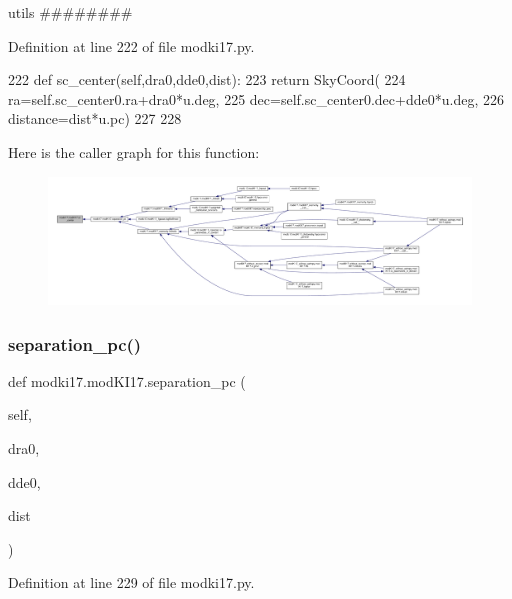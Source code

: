 utils \#\#\#\#\#\#\#\# 



Definition at line 222 of file modki17.\+py.


\begin{DoxyCode}
222     \textcolor{keyword}{def }sc\_center(self,dra0,dde0,dist):
223         \textcolor{keywordflow}{return} SkyCoord(
224             ra=self.sc\_center0.ra+dra0*u.deg,
225             dec=self.sc\_center0.dec+dde0*u.deg,
226             distance=dist*u.pc)
227 
228     
\end{DoxyCode}
Here is the caller graph for this function\+:\nopagebreak
\begin{figure}[H]
\begin{center}
\leavevmode
\includegraphics[width=350pt]{df/da3/classmodki17_1_1modKI17_ad898986b5d2781fbf18c5778d393805a_icgraph}
\end{center}
\end{figure}
\mbox{\label{classmodki17_1_1modKI17_aa68e948ebfbe3aeef6d9defb249317c4}} 
\subsubsection{\texorpdfstring{separation\+\_\+pc()}{separation\_pc()}}
{\footnotesize\ttfamily def modki17.\+mod\+K\+I17.\+separation\+\_\+pc (\begin{DoxyParamCaption}\item[{}]{self,  }\item[{}]{dra0,  }\item[{}]{dde0,  }\item[{}]{dist }\end{DoxyParamCaption})}



Definition at line 229 of file modki17.\+py.


